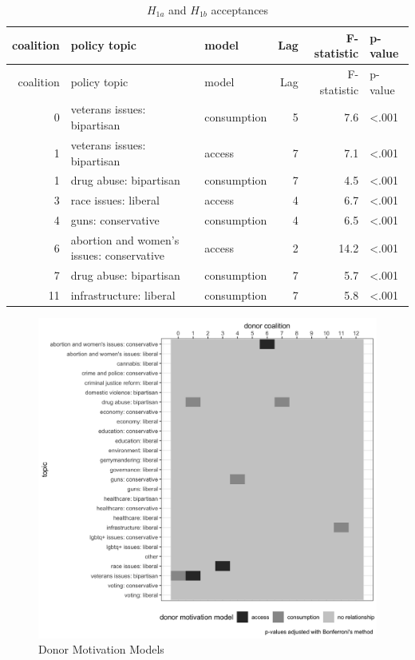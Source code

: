 \documentclass[12pt,]{article}
\begin{document}
\begin{longtable}[]{@{}rllrrl@{}}
\caption{\(H_{1a}\) and \(H_{1b}\) acceptances}\tabularnewline
\toprule
coalition & policy topic & model & Lag & F-statistic & p-value \\
\midrule
\endfirsthead
\toprule
coalition & policy topic & model & Lag & F-statistic & p-value \\
\midrule
\endhead
0 & veterans issues: bipartisan & consumption & 5 & 7.6 &
\textless.001 \\
1 & veterans issues: bipartisan & access & 7 & 7.1 & \textless.001 \\
1 & drug abuse: bipartisan & consumption & 7 & 4.5 & \textless.001 \\
3 & race issues: liberal & access & 4 & 6.7 & \textless.001 \\
4 & guns: conservative & consumption & 4 & 6.5 & \textless.001 \\
6 & abortion and women's issues: conservative & access & 2 & 14.2 &
\textless.001 \\
7 & drug abuse: bipartisan & consumption & 7 & 5.7 & \textless.001 \\
11 & infrastructure: liberal & consumption & 7 & 5.8 & \textless.001 \\
\bottomrule
\end{longtable}

\begin{figure}
\centering
\includegraphics{../tables_and_figures/fig_2.jpg}
\caption{Donor Motivation Models}
\end{figure}
\end{document}
